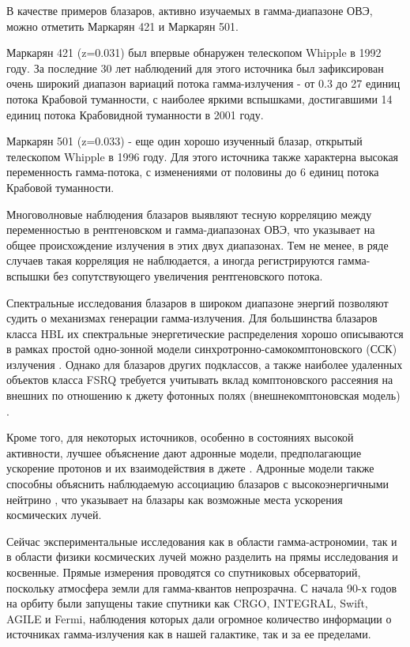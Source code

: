 В качестве примеров блазаров, активно изучаемых в гамма-диапазоне ОВЭ, можно отметить Маркарян 421 и Маркарян 501.

Маркарян 421 (z=0.031) был впервые обнаружен телескопом Whipple в 1992 году. За последние 30 лет наблюдений для этого источника был зафиксирован очень широкий диапазон вариаций потока гамма-излучения - от 0.3 до 27 единиц потока Крабовой туманности, с наиболее яркими вспышками, достигавшими 14 единиц потока Крабовидной туманности в 2001 году\cite{Tluczykont_2010}.

Маркарян 501 (z=0.033) - еще один хорошо изученный блазар, открытый телескопом Whipple в 1996 году. Для этого источника также характерна высокая переменность гамма-потока, с изменениями от половины до 6 единиц потока Крабовой туманности\cite{Aharonian_MRK501}.

Многоволновые наблюдения блазаров выявляют тесную корреляцию между переменностью в рентгеновском и гамма-диапазонах ОВЭ\cite{Multi_Mrk421_2005, Albert_2007, Acciari_2011}, что указывает на общее происхождение излучения в этих двух диапазонах. Тем не менее, в ряде случаев такая корреляция не наблюдается, а иногда регистрируются гамма-вспышки без сопутствующего увеличения рентгеновского потока\cite{Krawczynski_2004, Acciari_flare_2020}.

Спектральные исследования блазаров в широком диапазоне энергий позволяют судить о механизмах генерации гамма-излучения. Для большинства блазаров класса HBL их спектральные энергетические распределения хорошо описываются в рамках простой одно-зонной модели синхротронно-самокомптоновского (ССК) излучения \cite{Multi_Mrk421_2005, Acciari_2011, MRK421_2008_flare_multi}. Однако для блазаров других подклассов, а также наиболее удаленных объектов класса FSRQ требуется учитывать вклад комптоновского рассеяния на внешних по отношению к джету фотонных полях (внешнекомптоновская модель) \cite{JET_COMPTONIZATION, HESS_BLAZAR_2019}.

Кроме того, для некоторых источников, особенно в состояниях высокой активности, лучшее объяснение дают адронные модели, предполагающие ускорение протонов и их взаимодействия в джете \cite{Aharonian_BLAZARS, Acciari_flare_2020}. Адронные модели также способны объяснить наблюдаемую ассоциацию блазаров с высокоэнергичными нейтрино \cite{ICE_CUBE_2018}, что указывает на блазары как возможные места ускорения космических лучей.

Сейчас экспериментальные исследования как в области гамма-астрономии, так и в области физики космических лучей можно разделить на прямы исследования и косвенные. Прямые измерения проводятся со спутниковых обсерваторий, поскольку атмосфера земли для гамма-квантов непрозрачна. С начала 90-х годов на орбиту были запущены такие спутники как CRGO, INTEGRAL, Swift, AGILE и Fermi, наблюдения которых дали огромное количество информации о источниках гамма-излучения как в нашей галактике, так и за ее пределами. 

